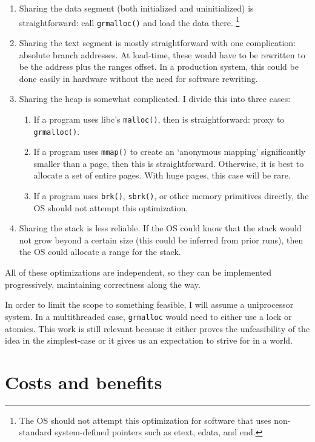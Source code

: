 \documentclass[sigconf,screen,nonacm,natbib]{acmart}
\begin{document}
\begin{enumerate}
\item
  Sharing the data segment (both initialized and uninitialized) is straightforward: call \texttt{grmalloc()} and load the data there.
  \footnote{The OS should not attempt this optimization for software that uses non-standard system-defined pointers such as etext, edata, and end\citep{end}.}
\item
  Sharing the text segment is mostly straightforward with one complication: absolute branch addresses.
  At load-time, these would have to be rewritten to be the address plus the ranges offset.
  In a production system, this could be done easily in hardware without the need for software rewriting.
\item
  Sharing the heap is somewhat complicated. I divide this into three cases:
  \begin{enumerate}
  \item
    If a program uses libc's \texttt{malloc()}, then is straightforward: proxy to \texttt{grmalloc()}.
  \item
    If a program uses \texttt{mmap()} to create an `anonymous mapping' significantly smaller than a page, then this is straightforward. Otherwise, it is best to allocate a set of entire pages. With huge pages, this case will be rare.
  \item
    If a program uses \texttt{brk()}, \texttt{sbrk()}, or other memory primitives directly, the OS should not attempt this optimization.
  \end{enumerate}
\item
  Sharing the stack is less reliable.
  If the OS could know that the stack would not grow beyond a certain size (this could be inferred from prior runs), then the OS could allocate a range for the stack.
\end{enumerate}

All of these optimizations are independent, so they can be implemented progressively, maintaining correctness along the way.

In order to limit the scope to something feasible, I will assume a uniprocessor system.
In a multithreaded case, \texttt{grmalloc} would need to either use a lock or atomics.
This work is still relevant because it either proves the unfeasibility of the idea in the simplest-case or it gives us an expectation to strive for in a world.

\section{Costs and benefits}
\end{document}
